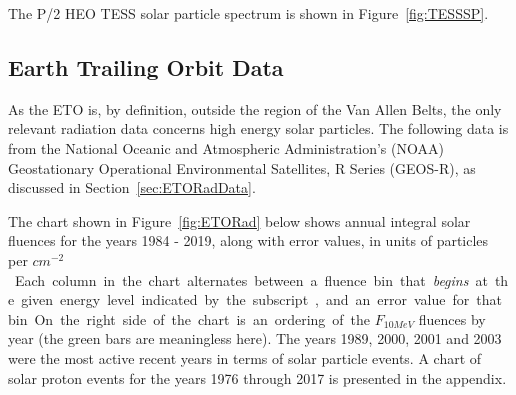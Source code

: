 \documentclass[11pt]{article}
\begin{document}
The P/2 HEO TESS solar particle spectrum is shown in Figure~\ref{fig:TESSSP}.

\subsection{Earth Trailing Orbit Data}
\label{sec:GEOS}

As the ETO is, by definition, outside the region of the Van Allen Belts, the only relevant radiation data concerns high energy solar particles. The following data is from the National Oceanic and Atmospheric Administration's (NOAA) Geostationary Operational Environmental Satellites, R Series (GEOS-R), as discussed in Section~\ref{sec:ETORadData}.

The chart shown in Figure~\ref{fig:ETORad} below shows annual integral solar fluences for the years 1984 - 2019, along with error values, in units of particles per \unit{$cm^{-2}$}. Each column in the chart alternates between a fluence bin that \textit{begins} at the given energy level indicated by the subscript, and an error value for that bin. On the right side of the chart is an ordering of the $F_{10 MeV}$ fluences by year (the green bars are meaningless here). The years 1989, 2000, 2001 and 2003 were the most active recent years in terms of solar particle events. A chart of solar proton events for the years 1976 through 2017 is presented in the appendix.
\end{document}
